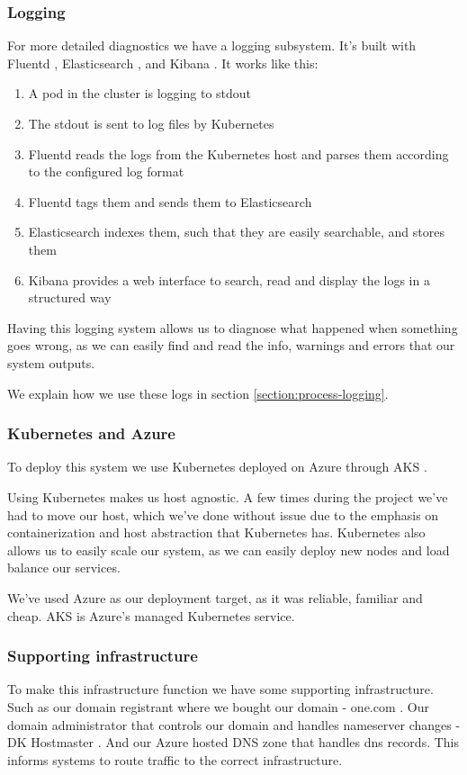 \subsubsection{Logging}
For more detailed diagnostics we have a logging subsystem. It's built with Fluentd \cite{tool:fluentd}, Elasticsearch \cite{tool:elasticsearch}, and Kibana \cite{tool:kibana}.
It works like this:
\begin{enumerate}
  \item A pod in the cluster is logging to stdout
  \item The stdout is sent to log files by Kubernetes
  \item Fluentd reads the logs from the Kubernetes host and parses them according to the configured log format
  \item Fluentd tags them and sends them to Elasticsearch
  \item Elasticsearch indexes them, such that they are easily searchable, and stores them
  \item Kibana provides a web interface to search, read and display the logs in a structured way
\end{enumerate}
Having this logging system allows us to diagnose what happened when something goes wrong, as we can easily find and read the info, warnings and errors that our system outputs.

We explain how we use these logs in section \ref{section:process-logging}.

\subsubsection{Kubernetes and Azure}
To deploy this system we use Kubernetes \cite{tool:kubernetes} deployed on Azure \cite{tool:azure} through AKS \cite{tool:aks}.

Using Kubernetes makes us host agnostic.
A few times during the project we've had to move our host, which we've done without issue due to the emphasis on containerization and host abstraction that Kubernetes has.
Kubernetes also allows us to easily scale our system, as we can easily deploy new nodes and load balance our services.

We've used Azure as our deployment target, as it was reliable, familiar and cheap. AKS is Azure's managed Kubernetes service.

\subsubsection{Supporting infrastructure}
To make this infrastructure function we have some supporting infrastructure.
Such as our domain registrant where we bought our domain - one.com \cite{onecom}.
Our domain administrator that controls our domain and handles nameserver changes - DK Hostmaster \cite{dk-hostmaster}.
And our Azure hosted DNS zone \cite{tool:dns-zone} that handles dns records. This informs systems to route traffic to the correct infrastructure.
